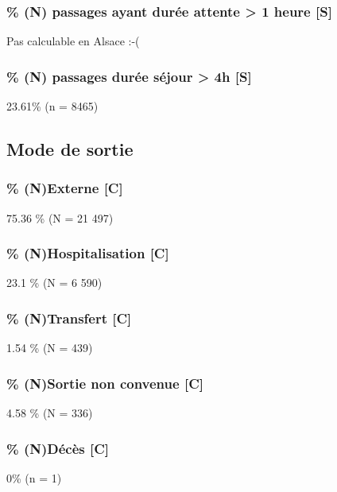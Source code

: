 \documentclass[]{article}
\begin{document}
\subsubsection{\% (N) passages ayant durée attente \textgreater{} 1
heure {[}S{]}}\label{n-passages-ayant-duree-attente-1-heure-s}

Pas calculable en Alsace :-(

\subsubsection{\% (N) passages durée séjour \textgreater{} 4h
{[}S{]}}\label{n-passages-duree-sejour-4h-s}

23.61\% (n = 8465)

\subsection{Mode de sortie}\label{mode-de-sortie}

\subsubsection{\% (N)Externe {[}C{]}}\label{nexterne-c}

75.36 \% (N = 21 497)

\subsubsection{\% (N)Hospitalisation {[}C{]}}\label{nhospitalisation-c}

23.1 \% (N = 6 590)

\subsubsection{\% (N)Transfert {[}C{]}}\label{ntransfert-c}

1.54 \% (N = 439)

\subsubsection{\% (N)Sortie non convenue
{[}C{]}}\label{nsortie-non-convenue-c}

4.58 \% (N = 336)

\subsubsection{\% (N)Décès {[}C{]}}\label{ndeces-c}

0\% (n = 1)
\end{document}
